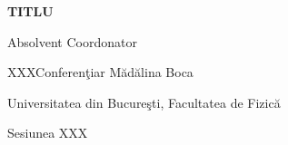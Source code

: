 \pagestyle{empty}
\vspace*{5cm}

\begin{center}
\begin{Large}
{\bf TITLU}
\end{Large}
\end{center}

\vspace*{7cm}

\begin{large}
Absolvent	\hfill Coordonator\hspace*{3.5cm}

XXX\hfill Conferen\c tiar M\u{a}d\u{a}lina Boca
\end{large}

\vfill

\begin{center}
Universitatea din Bucure\c sti, Facultatea de Fizic\u a

Sesiunea XXX 

\end{center}